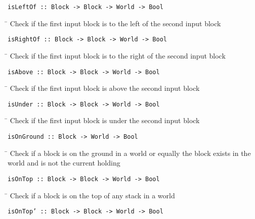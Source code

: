 \begin{verbatim}
isLeftOf :: Block -> Block -> World -> Bool
\end{verbatim}
\begin{tabbing}
\hspace*{1cm}\= \kill
\> Check if the first input block is to the left of the second input block
\end{tabbing}
\begin{verbatim}
isRightOf :: Block -> Block -> World -> Bool
\end{verbatim}
\begin{tabbing}
\hspace*{1cm}\= \kill
\> Check if the first input block is to the right of the second input block
\end{tabbing}
\begin{verbatim}
isAbove :: Block -> Block -> World -> Bool
\end{verbatim}
\begin{tabbing}
\hspace*{1cm}\= \kill
\> Check if the first input block is above the second input block
\end{tabbing}
\begin{verbatim}
isUnder :: Block -> Block -> World -> Bool
\end{verbatim}
\begin{tabbing}
\hspace*{1cm}\= \kill
\> Check if the first input block is under the second input block
\end{tabbing}
\begin{verbatim}
isOnGround :: Block -> World -> Bool
\end{verbatim}
\begin{tabbing}
\hspace*{1cm}\= \kill
\> Check if a block is on the ground in a world or equally the block exists in the \\
\> world and is not the current holding
\end{tabbing}
\begin{verbatim}
isOnTop :: Block -> Block -> World -> Bool
\end{verbatim}
\begin{tabbing}
\hspace*{1cm}\= \kill
\> Check if a block is on the top of any stack in a world
\end{tabbing}
\begin{verbatim}
isOnTop’ :: Block -> Block -> World -> Bool
\end{verbatim}
